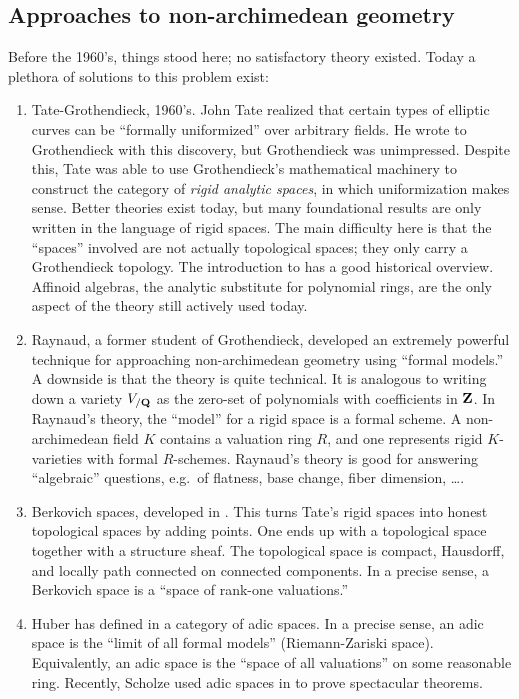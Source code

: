 \subsection{Approaches to non-archimedean geometry}

Before the 1960's, things stood here; no satisfactory theory existed. Today 
a plethora of solutions to this problem exist:
\begin{enumerate}
\item Tate-Grothendieck, 1960's. John Tate realized that certain types of 
elliptic curves can be ``formally uniformized'' over arbitrary fields. He wrote 
to Grothendieck with this discovery, but Grothendieck was unimpressed. Despite 
this, Tate was able to use Grothendieck's mathematical machinery to construct 
the category of \emph{rigid analytic spaces}, in which uniformization makes 
sense. Better theories exist today, but many foundational results are only 
written in the language of rigid spaces. The main difficulty here is that the 
``spaces'' involved are not actually topological spaces; they only carry a 
Grothendieck topology. The introduction to \cite{aws-2008} has a good 
historical overview. Affinoid algebras, the analytic substitute for polynomial 
rings, are the only aspect of the theory still actively used today. 

\item Raynaud, a former student of Grothendieck, developed an extremely 
powerful technique for approaching non-archimedean geometry using ``formal 
models.'' A downside is that the theory is quite technical. It is analogous to 
writing down a variety $V_{/\mathbf{Q}}$ as the zero-set of polynomials with 
coefficients in $\mathbf{Z}$. In Raynaud's theory, the ``model'' for a rigid space is 
a formal scheme. A non-archimedean field $K$ contains a valuation ring $R$, and 
one represents rigid $K$-varieties with formal $R$-schemes. Raynaud's theory is 
good for answering ``algebraic'' questions, e.g.~of flatness, base change, 
fiber dimension, \ldots. 

\item Berkovich spaces, developed in \cite{berkovich-1990}. This turns Tate's 
rigid spaces into honest topological spaces by adding points. One ends up with 
a topological space together with a structure sheaf. The topological space is 
compact, Hausdorff, and locally path connected on connected components. In a 
precise sense, a Berkovich space is a ``space of rank-one valuations.'' 

\item Huber has defined in \cite{huber-1996} a category of adic spaces. In a 
precise sense, an adic 
space is the ``limit of all formal models'' (Riemann-Zariski space). 
Equivalently, an adic space is the ``space of all valuations'' on some 
reasonable ring. Recently, Scholze used adic spaces in \cite{scholze-2012} to prove 
spectacular theorems. 
\end{enumerate}

